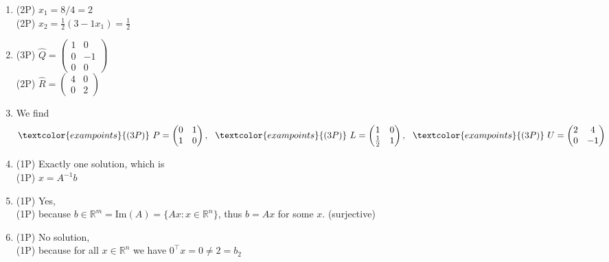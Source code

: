 {\color{solution}
\begin{enumerate}
	\item \textcolor{exampoints}{(2P)}  $x_1 = 8/4 = 2$\\
	\textcolor{exampoints}{(2P)} 
	$x_2 = \frac{1}{2}(3 - 1x_1) =  \frac{1}{2}$
	\item \textcolor{exampoints}{(3P)}
	$\widehat{Q} = \begin{pmatrix}
	 1&0\\0&-1\\0&0
	\end{pmatrix}$\\
 \textcolor{exampoints}{(2P)}	$\widehat{R}= \begin{pmatrix}
	4 & 0\\0&2
\end{pmatrix} $
\item We find
$$\textcolor{exampoints}{(3P)}~P = \begin{pmatrix}
0 & 1\\
1 & 0
\end{pmatrix},~~ \textcolor{exampoints}{(3P)}~L=\begin{pmatrix}
1 & 0\\
\frac{1}{2} & 1
\end{pmatrix},~~ \textcolor{exampoints}{(3P)} ~U=\begin{pmatrix}
2 & 4\\
0 & -1
\end{pmatrix}
$$
\item \textcolor{exampoints}{(1P)} Exactly one solution, which is \\ \textcolor{exampoints}{(1P)} $x=A^{-1}b$
\item \textcolor{exampoints}{(1P)} Yes,  \\
\textcolor{exampoints}{(1P)} because $b \in\mathbb{R}^m=\text{Im}(A)=\{Ax: x\in\mathbb{R}^n\}$, thus $b=Ax$ for some $x$. (surjective)
\item \textcolor{exampoints}{(1P)} No solution, \\
\textcolor{exampoints}{(1P)} because for all  $x\in\mathbb{R}^n$ we have $0^\top x = 0 \neq 2 = b_2$
\end{enumerate}
}
